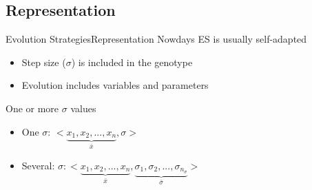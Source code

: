 \documentclass[10pt,compress]{beamer} %
\begin{document}
\subsection{Representation}
\begin{frame}{Evolution Strategies}{Representation}
	Nowdays ES is usually self-adapted
	\begin{itemize}
		\item Step size ($\sigma$) is included in the genotype
		\item Evolution includes variables and parameters
	\end{itemize}
	One or more $\sigma$ values
	\begin{itemize}
		\item One  $\sigma$: $\big<\underbrace{x_1, x_2, ..., x_n}_{\bar{x}},\sigma\big>$
		\item Several: $\sigma : \big<\underbrace{x_1, x_2, ..., x_n}_{\bar{x}},
		\underbrace{\sigma_1, \sigma_2, ..., \sigma_{n_{\sigma}}}_{\bar{\sigma}}\big>$
	\end{itemize}
\end{frame}

\end{document}
